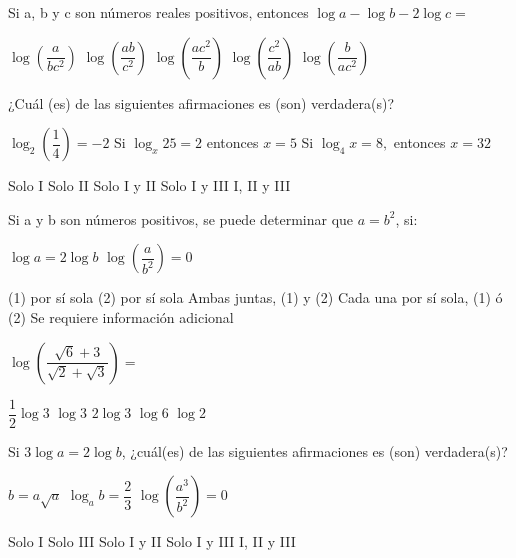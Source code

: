\documentclass[pagina vacia]{srs}
\begin{document}
\begin{preguntas}
\pregunta Si a, b y c son números reales positivos, entonces $\log a-\log b-2 \log c=$
\begin{vertical}
\alternativa $\log\left(\dfrac{a}{bc^{2}}\right)$
\alternativa $\log\left(\dfrac{ab}{c^{2}}\right)$
\alternativa $\log\left(\dfrac{ac^{2}}{b}\right)$
\alternativa $\log\left(\dfrac{c^{2}}{ab}\right)$
\alternativa $\log\left(\dfrac{b}{ac^{2}}\right)$
\end{vertical}

\pregunta ¿Cuál (es) de las siguientes afirmaciones es (son) verdadera(s)?
\begin{verticali}
\alternativa $\log_{2}\left(\dfrac{1}{4}\right)=-2$
\alternativa Si $\log_{x}25=2$ entonces $x=5$
\alternativa Si $\log_{4}x=8,$ entonces $x=32$
\end{verticali}
\begin{vertical}
\alternativa Solo I
\alternativa Solo II
\alternativa Solo I y II
\alternativa Solo I y III
\alternativa I, II y III
\end{vertical}

\pregunta Si a y b son números positivos, se puede determinar que $a=b^{2}$, si:
\begin{verticaln}
\alternativa $\log a=2 \log b$
\alternativa $\log\left(\dfrac{a}{b^{2}}\right)=0$
\end{verticaln}
\begin{vertical}
\alternativa (1) por sí sola
\alternativa (2) por sí sola
\alternativa Ambas juntas, (1) y (2)
\alternativa Cada una por sí sola, (1) ó (2)
\alternativa Se requiere información adicional
\end{vertical}

\pregunta $\log\left(\dfrac{\sqrt{6}+3}{\sqrt{2}+\sqrt{3}}\right)=$
\begin{vertical}
\alternativa $\dfrac{1}{2}\log 3$
\alternativa $\log 3$
\alternativa $2 \log 3$
\alternativa $\log 6$
\alternativa $\log 2$
\end{vertical}

\pregunta Si $3 \log a=2 \log b$, ¿cuál(es) de las siguientes afirmaciones es (son) verdadera(s)?
\begin{verticali}
\alternativa $b=a\sqrt{a}$
\alternativa $\log_{a}b=\dfrac{2}{3}$
\alternativa $\log\left(\dfrac{a^{3}}{b^{2}}\right)=0$
\end{verticali}
\begin{vertical}
\alternativa Solo I
\alternativa Solo III
\alternativa Solo I y II
\alternativa Solo I y III
\alternativa I, II y III
\end{vertical}


\end{preguntas}
\end{document}
